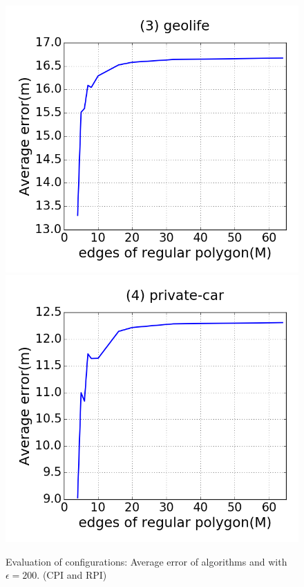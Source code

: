 \begin{figure}[tb!]
\includegraphics[scale = 0.250]{figures/Exp-M-error-geolife.png}
\includegraphics[scale = 0.250]{figures/Exp-M-error-private.png}
\vspace{-2ex}
\caption{\small Evaluation of configurations: Average error of algorithms \cist and \cista with $\epsilon = 200$. (CPI and RPI)}
\label{fig:m-error-e200}
\vspace{-1ex}
\end{figure}


